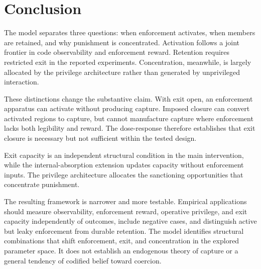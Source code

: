\documentclass[12pt]{article}
\begin{document}
\section{Conclusion}

The model separates three questions: when enforcement activates, when members are retained, and why punishment is concentrated. Activation follows a joint frontier in code observability and enforcement reward. Retention requires restricted exit in the reported experiments. Concentration, meanwhile, is largely allocated by the privilege architecture rather than generated by unprivileged interaction.

These distinctions change the substantive claim. With exit open, an enforcement apparatus can activate without producing capture. Imposed closure can convert activated regions to capture, but cannot manufacture capture where enforcement lacks both legibility and reward. The dose-response therefore establishes that exit closure is necessary but not sufficient within the tested design.

Exit capacity is an independent structural condition in the main intervention, while the internal-absorption extension updates capacity without enforcement inputs. The privilege architecture allocates the sanctioning opportunities that concentrate punishment.

The resulting framework is narrower and more testable. Empirical applications should measure observability, enforcement reward, operative privilege, and exit capacity independently of outcomes, include negative cases, and distinguish active but leaky enforcement from durable retention. The model identifies structural combinations that shift enforcement, exit, and concentration in the explored parameter space. It does not establish an endogenous theory of capture or a general tendency of codified belief toward coercion.



\end{document}
